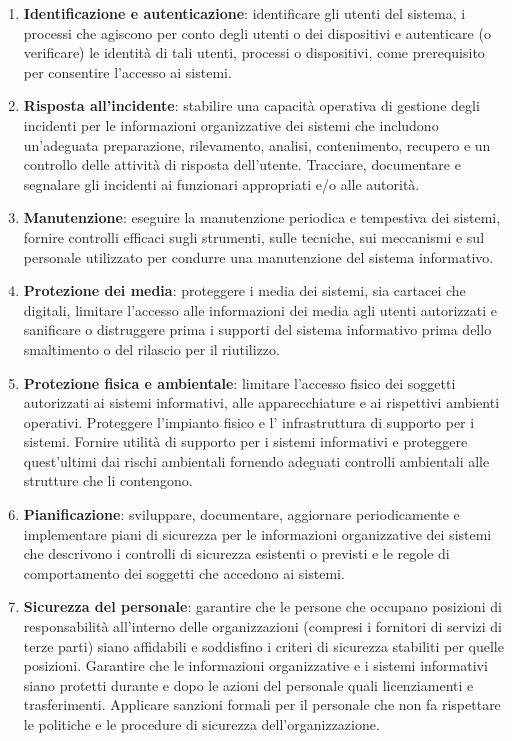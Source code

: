 \begin{enumerate}
    \item \textbf{Identificazione e autenticazione}: identificare gli utenti del sistema, i processi che agiscono per conto degli utenti o dei dispositivi e autenticare (o verificare) le identità di tali utenti, processi o dispositivi, come prerequisito per consentire l'accesso ai sistemi.
    \item \textbf{Risposta all'incidente}: stabilire una capacità operativa di gestione degli incidenti per le informazioni organizzative dei sistemi che includono un'adeguata preparazione, rilevamento, analisi, contenimento, recupero e un controllo delle attività di risposta dell'utente. Tracciare, documentare e segnalare gli incidenti ai funzionari appropriati e/o alle autorità.
    \item \textbf{Manutenzione}: eseguire la manutenzione periodica e tempestiva dei sistemi, fornire controlli efficaci sugli strumenti, sulle tecniche, sui meccanismi e sul personale utilizzato per condurre una manutenzione del sistema informativo.
    \item \textbf{Protezione dei media}: proteggere i media dei sistemi, sia cartacei che digitali, limitare l'accesso alle informazioni dei media agli utenti autorizzati e sanificare o distruggere prima i supporti del sistema informativo prima dello smaltimento o del rilascio per il riutilizzo.
    \item \textbf{Protezione fisica e ambientale}: limitare l'accesso fisico dei soggetti autorizzati ai sistemi informativi, alle apparecchiature e ai rispettivi ambienti operativi. Proteggere l'impianto fisico e l' infrastruttura di supporto per i sistemi. Fornire utilità di supporto per i sistemi informativi e proteggere quest'ultimi dai rischi ambientali fornendo adeguati controlli ambientali alle strutture che li contengono.
    \item \textbf{Pianificazione}: sviluppare, documentare, aggiornare periodicamente e implementare piani di sicurezza per le informazioni organizzative dei sistemi che descrivono i controlli di sicurezza esistenti o previsti e le regole di comportamento dei soggetti che accedono ai sistemi.
    \item \textbf{Sicurezza del personale}: garantire che le persone che occupano posizioni di responsabilità all'interno delle organizzazioni (compresi i fornitori di servizi di terze parti) siano affidabili e soddisfino i criteri di sicurezza stabiliti per quelle posizioni. Garantire che le informazioni organizzative e i sistemi informativi siano protetti durante e dopo le azioni del personale quali licenziamenti e trasferimenti. Applicare sanzioni formali per il personale che non fa rispettare le politiche e le procedure di sicurezza dell'organizzazione.

\end{enumerate}
